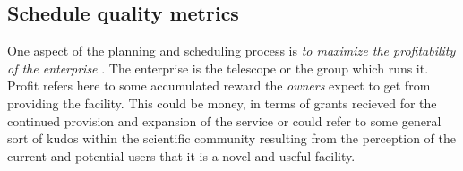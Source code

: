
\subsection{Schedule quality metrics}
\label{sect:sqms}
One aspect of the planning and scheduling process is \emph{to maximize the profitability of the enterprise} \citep{miyashita96distributed}. The enterprise is the telescope or the group which runs it. Profit refers here to some accumulated reward the \emph{owners} expect to get from providing the facility. This could be money, in terms of grants recieved for the continued provision and expansion of the service or could refer to some general sort of kudos within the scientific community resulting from the perception of the current and potential users that it is a novel and useful facility.




